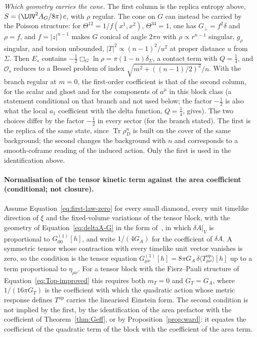\emph{Which geometry carries the cone.} The first column is the replica entropy above, \(S=(\LUV^2A_G/8\pi)\,c\), with \(\rho\) regular. The cone on \(G\) can instead be carried by the Poisson structure: for \(\Theta^{12}=1/f(x^1,x^2)\), \(\Theta^{34}=1\), one has \(G_\perp=f^2\delta\) and \(\rho=f\), and \(f=|z|^{n-1}\) makes \(G\) conical of angle \(2\pi n\) with \(\rho\propto r^{n-1}\) singular, \(g_\rho\) singular, and torsion unbounded, \(|T|^2\propto(n-1)^2/u^2\) at proper distance \(u\) from \(\Sigma\). Then \(E_s\) contains \(-\tfrac12\Box_G\ln\rho=\pi(1-n)\delta_\Sigma\), a contact term with \(Q=\tfrac14\), and \(\mathcal O_s\) reduces to a Bessel problem of index \(\sqrt{m^2+((n-1)/2)^2}/n\). With the branch regular at \(m=0\), the first-order coefficient is that of the second column, for the scalar and ghost and for the components of \(a^\mu\) in this block class (a statement conditional on that branch and not used below; the factor \(-\tfrac12\) is also what the local \(a_1\) coefficient with the delta function, \(Q=\tfrac14\), gives). The two choices differ by the factor \(-\tfrac12\) in every sector (for the branch stated). The first is the replica of the same state, since \(\operatorname{Tr}\rho_D^n\) is built on the cover of the same background; the second changes the background with \(n\) and corresponds to a smooth-coframe reading of the induced action. Only the first is used in the identification above.

\paragraph{Normalisation of the tensor kinetic term against the area coefficient (conditional; not closure).}
Assume Equation~\eqref{eq:first-law-zero} for every small diamond, every unit timelike direction of \(\xi\) and the fixed-volume variations of the tensor block, with the geometry of Equation~\eqref{eq:deltaA-G} in the form of~\cite{Jacobson2016}, in which \(\delta A|_V\) is proportional to \(G^{(1)}_{00}[h]\), and write \(1/(4G_A)\) for the coefficient of \(\delta A\). A symmetric tensor whose contraction with every timelike unit vector vanishes is zero, so the condition is the tensor equation \(G^{(1)}_{\mu\nu}[h]=8\pi G_A\,\delta\langle T^{\mathrm{op}}_{\mu\nu}\rangle[h]\) up to a term proportional to \(\eta_{\mu\nu}\). For a tensor block with the Fierz--Pauli structure of Equation~\eqref{eq:Top-improved} this requires both \(m_T=0\) and \(G_T=G_A\), where \(1/(16\pi G_T)\) is the coefficient with which the quadratic action whose metric response defines \(T^{\mathrm{op}}\) carries the linearised Einstein form. The second condition is not implied by the first, by the identification of the area prefactor with the coefficient of Theorem~\ref{thm:Geff}, or by Proposition~\ref{prop:ward}: it equates the coefficient of the quadratic term of the block with the coefficient of the area term.

